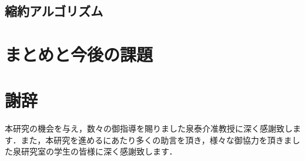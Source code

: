 \documentclass{thesis}
\theoremstyle{definition}
\begin{document}
\section{縮約アルゴリズム}


\chapter{まとめと今後の課題}

\chapter{謝辞}
本研究の機会を与え，数々の御指導を賜りました泉泰介准教授に深く感謝致します．また，本研究を進めるにあたり多くの助言を頂き，様々な御協力を頂きました泉研究室の学生の皆様に深く感謝致します．




%
\end{document}
